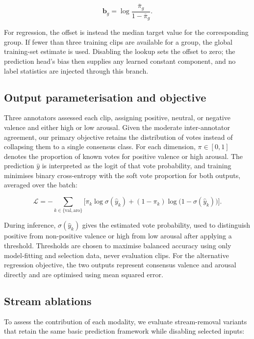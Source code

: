 \documentclass[11pt]{article}
\newcommand{\vb}{\mathbf{b}}
\begin{document}
\begin{equation}
  \vb_{g} = \log\frac{\bar{\pi}_{g}}{1-\bar{\pi}_{g}}.
\end{equation}

For regression, the offset is instead the median target value for the corresponding group. If fewer than three training clips are available for a group, the global training-set estimate is used. Disabling the lookup sets the offset to zero; the prediction head's bias then supplies any learned constant component, and no label statistics are injected through this branch.

\subsection{Output parameterisation and objective}
\label{sec:objective}

Three annotators assessed each clip, assigning positive, neutral, or negative valence and either high or low arousal. Given the moderate inter-annotator agreement, our primary objective retains the distribution of votes instead of collapsing them to a single consensus class. For each dimension, $\pi\in[0,1]$ denotes the proportion of known votes for positive valence or high arousal. The prediction $\hat{y}$ is interpreted as the logit of that vote probability, and training minimises binary cross-entropy with the soft vote proportion for both outputs, averaged over the batch:

\begin{equation}
  \mathcal{L} = -\sum_{k\in\{\text{val},\text{aro}\}}\Big[\pi_k\log\sigma(\hat{y}_k)+(1-\pi_k)\log\big(1-\sigma(\hat{y}_k)\big)\Big].
\end{equation}

During inference, $\sigma(\hat{y}_k)$ gives the estimated vote probability, used to distinguish positive from non-positive valence or high from low arousal after applying a threshold. Thresholds are chosen to maximise balanced accuracy using only model-fitting and selection data, never evaluation clips. For the alternative regression objective, the two outputs represent consensus valence and arousal directly and are optimised using mean squared error.

\subsection{Stream ablations}
\label{sec:ablations}

To assess the contribution of each modality, we evaluate stream-removal variants that retain the same basic prediction framework while disabling selected inputs:
\end{document}
